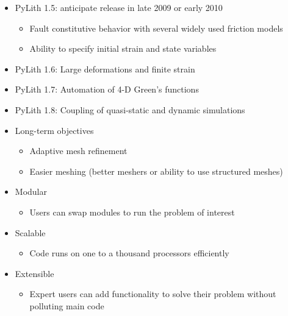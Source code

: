 \documentclass[pdftex,cig,slideColor]{pp4slides}
\begin{document}
  \begin{itemize}
  \item PyLith 1.5: anticipate release in late 2009 or early 2010
    \begin{itemize}
    \item Fault constitutive behavior with several widely used friction models
    \item Ability to specify initial strain and state variables
    \end{itemize}
  \item PyLith 1.6: Large deformations and finite strain
  \item PyLith 1.7: Automation of 4-D Green's functions
  \item PyLith 1.8: Coupling of quasi-static and dynamic simulations
  \item Long-term objectives
    \begin{itemize}
    \item Adaptive mesh refinement
    \item Easier meshing (better meshers or ability to use structured meshes)
    \end{itemize}
  \end{itemize}
  
  
  \begin{itemize}
  \item Modular
    \begin{itemize}
    \item Users can swap modules to run the problem of interest
    \end{itemize}
  \item Scalable
    \begin{itemize}
    \item Code runs on one to a thousand processors efficiently
    \end{itemize}    
  \item Extensible
    \begin{itemize}
    \item Expert users can add functionality to solve their problem
      without polluting main code
    \end{itemize}
  \end{itemize}

\end{document}
